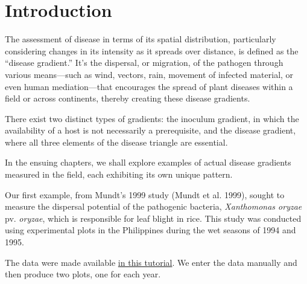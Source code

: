 \documentclass[
  letterpaper,
  DIV=11,
  numbers=noendperiod]{scrreprt}
\begin{document}
\hypertarget{introduction}{%
\section{Introduction}\label{introduction}}

The assessment of disease in terms of its spatial distribution,
particularly considering changes in its intensity as it spreads over
distance, is defined as the ``disease gradient.'' It's the dispersal, or
migration, of the pathogen through various means---such as wind,
vectors, rain, movement of infected material, or even human
mediation---that encourages the spread of plant diseases within a field
or across continents, thereby creating these disease gradients.

There exist two distinct types of gradients: the inoculum gradient, in
which the availability of a host is not necessarily a prerequisite, and
the disease gradient, where all three elements of the disease triangle
are essential.

In the ensuing chapters, we shall explore examples of actual disease
gradients measured in the field, each exhibiting its own unique pattern.

Our first example, from Mundt's 1999 study (Mundt et al. 1999), sought
to measure the dispersal potential of the pathogenic bacteria,
\emph{Xanthomonas oryzae} pv. \emph{oryzae}, which is responsible for
leaf blight in rice. This study was conducted using experimental plots
in the Philippines during the wet seasons of 1994 and 1995.

The data were made available
\href{https://www.apsnet.org/edcenter/disimpactmngmnt/topc/EcologyAndEpidemiologyInR/ModelingDispersalGradients/Pages/PrimaryDiseaseGradientsofBacteria.aspx}{in
this tutorial}. We enter the data manually and then produce two plots,
one for each year.
\end{document}
